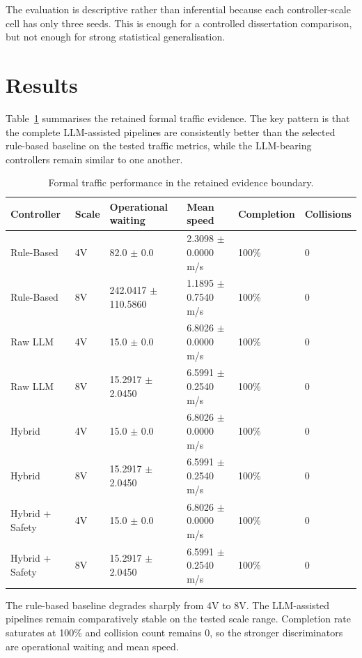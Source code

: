 \documentclass[letterpaper,10pt,conference]{ieeeconf}
\begin{document}
The evaluation is descriptive rather than inferential because each controller-scale cell has only three seeds. This is enough for a controlled dissertation comparison, but not enough for strong statistical generalisation.

\section{Results}
Table~\ref{tab:traffic_results} summarises the retained formal traffic evidence. The key pattern is that the complete LLM-assisted pipelines are consistently better than the selected rule-based baseline on the tested traffic metrics, while the LLM-bearing controllers remain similar to one another.

\begin{table}[t]
\centering
\caption{Formal traffic performance in the retained evidence boundary.}
\label{tab:traffic_results}
\renewcommand{\arraystretch}{1.1}
\begin{tabular}{p{2.75cm} p{0.9cm} p{2.25cm} p{2.05cm} p{1.35cm} p{1.15cm}}
\toprule
\textbf{Controller} & \textbf{Scale} & \textbf{Operational waiting} & \textbf{Mean speed} & \textbf{Completion} & \textbf{Collisions} \\
\midrule
Rule-Based & 4V & 82.0 $\pm$ 0.0 & 2.3098 $\pm$ 0.0000 m/s & 100\% & 0 \\
Rule-Based & 8V & 242.0417 $\pm$ 110.5860 & 1.1895 $\pm$ 0.7540 m/s & 100\% & 0 \\
Raw LLM & 4V & 15.0 $\pm$ 0.0 & 6.8026 $\pm$ 0.0000 m/s & 100\% & 0 \\
Raw LLM & 8V & 15.2917 $\pm$ 2.0450 & 6.5991 $\pm$ 0.2540 m/s & 100\% & 0 \\
Hybrid & 4V & 15.0 $\pm$ 0.0 & 6.8026 $\pm$ 0.0000 m/s & 100\% & 0 \\
Hybrid & 8V & 15.2917 $\pm$ 2.0450 & 6.5991 $\pm$ 0.2540 m/s & 100\% & 0 \\
Hybrid + Safety & 4V & 15.0 $\pm$ 0.0 & 6.8026 $\pm$ 0.0000 m/s & 100\% & 0 \\
Hybrid + Safety & 8V & 15.2917 $\pm$ 2.0450 & 6.5991 $\pm$ 0.2540 m/s & 100\% & 0 \\
\bottomrule
\end{tabular}
\end{table}

The rule-based baseline degrades sharply from 4V to 8V. The LLM-assisted pipelines remain comparatively stable on the tested scale range. Completion rate saturates at 100\% and collision count remains 0, so the stronger discriminators are operational waiting and mean speed.
\end{document}
